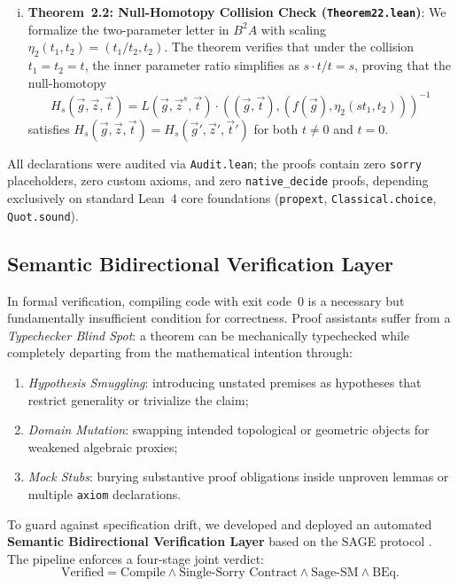 \documentclass[12 pt]{article}
\theoremstyle{definition}
\begin{document}
\begin{enumerate}[(i)]
    \item \textbf{Theorem~2.2: Null-Homotopy Collision Check (\texttt{Theorem22.lean})}:
    We formalize the two-parameter letter in $B^2A$ with scaling $\eta_2(t_1, t_2) = (t_1/t_2, t_2)$. The theorem verifies that under the collision $t_1 = t_2 = t$, the inner parameter ratio simplifies as $s \cdot t / t = s$, proving that the null-homotopy
    \[
    H_s(\vec{g}, \vec{z}, \vec{t}) = L(\vec{g}, \vec{z}^s, \vec{t}) \cdot \left((\vec{g}, \vec{t}), (f(\vec{g}), \eta_2(s t_1, t_2))\right)^{-1}
    \]
    satisfies $H_s(\vec{g}, \vec{z}, \vec{t}) = H_s(\vec{g}', \vec{z}', \vec{t}')$ for both $t \neq 0$ and $t = 0$.
\end{enumerate}

All declarations were audited via \texttt{Audit.lean}; the proofs contain zero \texttt{sorry} placeholders, zero custom axioms, and zero \texttt{native\_decide} proofs, depending exclusively on standard Lean~4 core foundations (\texttt{propext}, \texttt{Classical.choice}, \texttt{Quot.sound}).

\subsection{Semantic Bidirectional Verification Layer}

In formal verification, compiling code with exit code~0 is a necessary but fundamentally insufficient condition for correctness. Proof assistants suffer from a \emph{Typechecker Blind Spot}: a theorem can be mechanically typechecked while completely departing from the mathematical intention through:
\begin{enumerate}[(1)]
    \item \emph{Hypothesis Smuggling}: introducing unstated premises as hypotheses that restrict generality or trivialize the claim;
    \item \emph{Domain Mutation}: swapping intended topological or geometric objects for weakened algebraic proxies;
    \item \emph{Mock Stubs}: burying substantive proof obligations inside unproven lemmas or multiple \texttt{axiom} declarations.
\end{enumerate}

To guard against specification drift, we developed and deployed an automated \textbf{Semantic Bidirectional Verification Layer} based on the SAGE protocol \cite{SAGE}. The pipeline enforces a four-stage joint verdict:
\[
\text{Verified} = \text{Compile} \land \text{Single-Sorry Contract} \land \text{Sage-SM} \land \text{BEq}.
\]
\end{document}
